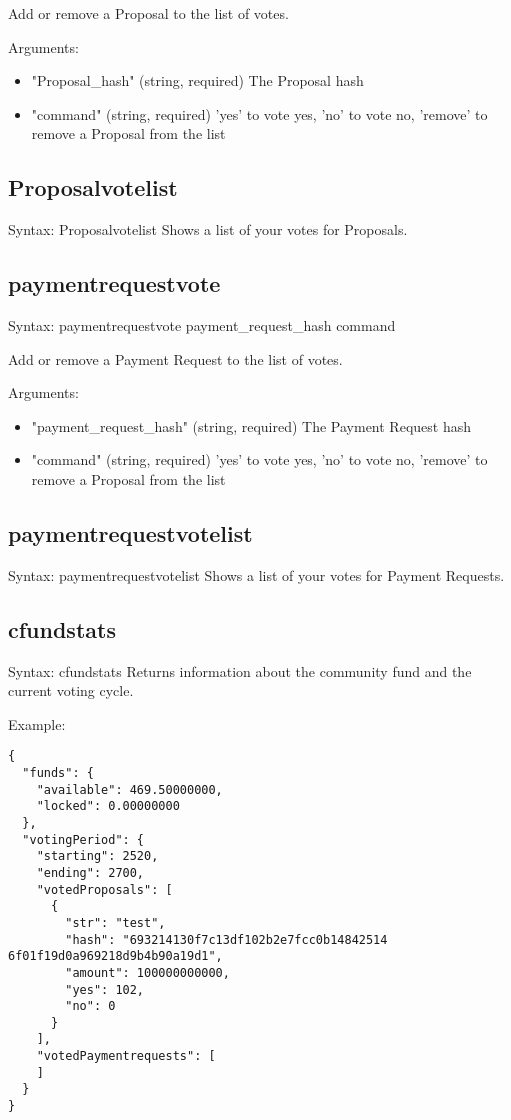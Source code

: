 \documentclass{artikel1}
\begin{document}
\begin{flushleft}
Add or remove a Proposal to the list of votes.

Arguments:
\begin{itemize}
\item "Proposal\_hash" (string, required) The Proposal hash
\item "command"       (string, required) 'yes' to vote yes, 'no' to vote no, 'remove' to remove a Proposal from the list
\end{itemize}                    
\subsection{Proposalvotelist}
Syntax: Proposalvotelist 
Shows a list of your votes for Proposals.
\subsection{paymentrequestvote}
Syntax: paymentrequestvote payment\_request\_hash command

Add or remove a Payment Request to the list of votes.

Arguments:
\begin{itemize}
\item "payment\_request\_hash" (string, required) The Payment Request hash
\item "command"       (string, required) 'yes' to vote yes, 'no' to vote no, 'remove' to remove a Proposal from the list
\end{itemize}        
\subsection{paymentrequestvotelist}
Syntax: paymentrequestvotelist 
Shows a list of your votes for Payment Requests.
\subsection{cfundstats}
Syntax: cfundstats
Returns information about the community fund and the current voting cycle.

Example:
\begin{lstlisting}
{
  "funds": {
    "available": 469.50000000,
    "locked": 0.00000000
  },
  "votingPeriod": {
    "starting": 2520,
    "ending": 2700,
    "votedProposals": [
      {
        "str": "test",
        "hash": "693214130f7c13df102b2e7fcc0b14842514 
6f01f19d0a969218d9b4b90a19d1",
        "amount": 100000000000,
        "yes": 102,
        "no": 0
      }
    ],
    "votedPaymentrequests": [
    ]
  }
}
\end{lstlisting}

\end{flushleft}
\end{document}
